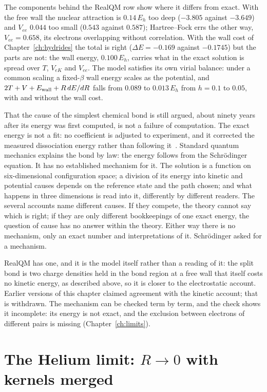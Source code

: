 The components behind the RealQM row show where it differs from exact. With the free wall the nuclear
attraction is $0.14\,E_h$ too deep ($-3.805$ against $-3.649$) and $V_{ee}$ $0.044$ too small ($0.543$ against
$0.587$); Hartree--Fock errs the other way, $V_{ee}=0.658$, its electrons overlapping without correlation.
With the wall cost of Chapter~\ref{ch:hydrides} the total is right ($\Delta E=-0.169$ against $-0.1745$) but
the parts are not: the wall energy, $0.100\,E_h$, carries what in the exact solution is spread over $T$,
$V_{eK}$ and $V_{ee}$. The model satisfies its own virial balance: under a common scaling a fixed-$\beta$ wall
energy scales as the potential, and $2T+V+E_{\rm wall}+R\,dE/dR$ falls from $0.089$ to $0.013\,E_h$ from
$h=0.1$ to $0.05$, with and without the wall cost.

That the cause of the simplest chemical bond is still argued, about ninety years after its energy was
first computed, is not a failure of computation. The exact energy is not a fit: no coefficient is
adjusted to experiment, and it corrected the measured dissociation energy rather than following
it~\cite{Kolos1968, Herzberg70}. Standard quantum mechanics explains the bond by law: the energy follows
from the Schr\"odinger equation. It has no established mechanism for it. The solution is a function on
six-dimensional configuration space; a division of its energy into kinetic and potential causes depends
on the reference state and the path chosen; and what happens in three dimensions is read into it,
differently by different readers. The several accounts name different causes. If they compete, the
theory cannot say which is right; if they are only different bookkeepings of one exact energy, the
question of cause has no answer within the theory. Either way there is no mechanism, only an exact
number and interpretations of it. Schr\"odinger asked for a mechanism.

RealQM has one, and it is the model itself rather than a reading of it: the split bond is two charge
densities held in the bond region at a free wall that itself costs no kinetic energy, as described
above, so it is closer to the electrostatic account. Earlier versions of this chapter claimed agreement
with the kinetic account; that is withdrawn. The mechanism can be checked term by term, and the check
shows it incomplete: its energy is not exact, and the exclusion between electrons of different pairs is
missing (Chapter~\ref{ch:limits}).

\section{The Helium limit: $R \to 0$ with kernels merged}\label{sec:he-limit}

